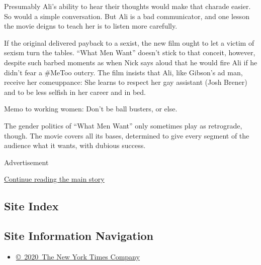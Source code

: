 Presumably Ali's ability to hear their thoughts would make that charade
easier. So would a simple conversation. But Ali is a bad communicator,
and one lesson the movie deigns to teach her is to listen more
carefully.

If the original delivered payback to a sexist, the new film ought to let
a victim of sexism turn the tables. ``What Men Want'' doesn't stick to
that conceit, however, despite such barbed moments as when Nick says
aloud that he would fire Ali if he didn't fear a \#MeToo outcry. The
film insists that Ali, like Gibson's ad man, receive her comeuppance:
She learns to respect her gay assistant (Josh Brener) and to be less
selfish in her career and in bed.

Memo to working women: Don't be ball busters, or else.

The gender politics of ``What Men Want'' only sometimes play as
retrograde, though. The movie covers all its bases, determined to give
every segment of the audience what it wants, with dubious success.

Advertisement

\protect\hyperlink{after-bottom}{Continue reading the main story}

\hypertarget{site-index}{%
\subsection{Site Index}\label{site-index}}

\hypertarget{site-information-navigation}{%
\subsection{Site Information
Navigation}\label{site-information-navigation}}

\begin{itemize}
\tightlist
\item
  \href{https://help.nytimes.com/hc/en-us/articles/115014792127-Copyright-notice}{©~2020~The
  New York Times Company}
\end{itemize}

